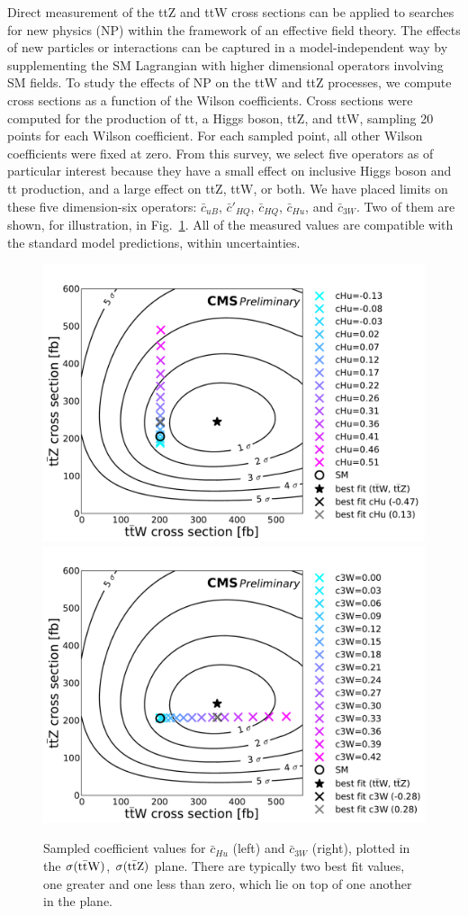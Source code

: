 \documentclass[a4paper]{PoS}
\begin{document}
Direct measurement of the ttZ and ttW cross sections can be applied to searches for new physics
(NP) within the framework of an effective field theory. The effects of new particles or
interactions can be captured in a model-independent way by supplementing the SM Lagrangian with
higher dimensional operators involving SM fields. To  study  the  effects  of  NP  on  the  ttW
and  ttZ  processes,  we  compute
cross sections as a function of the Wilson coefficients. Cross sections were computed for the
production of tt, a Higgs boson, ttZ, and ttW, sampling 20 points for each Wilson coefficient.
For each sampled point, all other Wilson coefficients were fixed at zero. From this survey,
we select five operators as of particular interest because they have a small effect on
inclusive Higgs boson and tt production, and a large effect on ttZ, ttW, or both. We have placed
limits on these five dimension-six operators:
${\bar{c}}_{uB}$,
${\bar{c}}'_{HQ}$,
${\bar{c}}_{HQ}$,
${\bar{c}}_{Hu}$,
and ${\bar{c}}_{3W}$.
Two of them are shown, for illustration, in
Fig.~\ref{fig:CMS-TOP-14-021}. All of the measured values are compatible with the
standard model predictions, within uncertainties.

\begin{figure}
\includegraphics[width=.45\textwidth]{figures/CMS-TOP-14-021_operator_points_color_cycled_cHu_ttZ_ttW_2d_v4}
\includegraphics[width=.45\textwidth]{figures/CMS-TOP-14-021_operator_points_color_cycled_c3W_ttZ_ttW_2d_v4}
\caption{Sampled coefficient values for ${\bar c}_{Hu}$ (left) and
  ${\bar c}_{3W}$ (right), plotted in the $\sigma({\rm t{\bar t}W})$,
  $\sigma({\rm t{\bar t}Z})$ plane. There are typically two best fit values, one
  greater and one less than zero, which lie on top of one another in the plane.}
\label{fig:CMS-TOP-14-021}
\end{figure}
\end{document}
